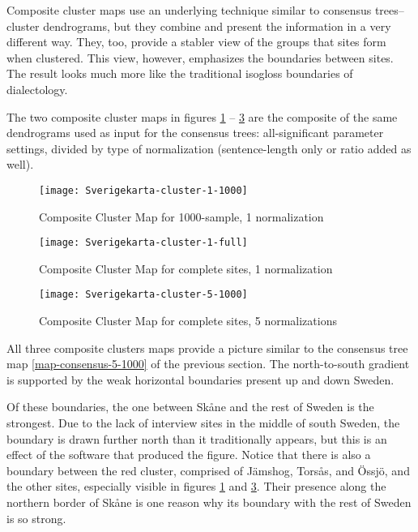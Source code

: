 Composite cluster maps use an underlying technique similar to
consensus trees--cluster dendrograms, but they combine and present the
information in a very different way. They, too, provide a stabler view
of the groups that sites form when clustered. This view, however,
emphasizes the boundaries between sites. The result looks
much more like the traditional isogloss boundaries of
dialectology.

The two composite cluster maps in figures \ref{map-composite-1-1000}
-- \ref{map-composite-5-1000} are the composite of the same
dendrograms used as input for the consensus trees: all-significant
parameter settings, divided by type of normalization (sentence-length
only or ratio added as well).

\begin{figure}
\texttt{[image: Sverigekarta-cluster-1-1000]}
\caption{Composite Cluster Map for 1000-sample, 1 normalization}
\label{map-composite-1-1000}
\end{figure}

\begin{figure}
\texttt{[image: Sverigekarta-cluster-1-full]}
\caption{Composite Cluster Map for complete sites, 1 normalization}
\label{map-composite-1-full}
\end{figure}

\begin{figure}
\texttt{[image: Sverigekarta-cluster-5-1000]}
\caption{Composite Cluster Map for complete sites, 5 normalizations}
\label{map-composite-5-1000}
\end{figure}

All three composite clusters maps provide a picture similar to the
consensus tree map \ref{map-consensus-5-1000} of the previous
section. The north-to-south gradient is supported by the
weak horizontal boundaries present up and down Sweden.

Of these boundaries, the one between Sk\aa{}ne and the rest of Sweden is
the strongest. Due to the lack of interview sites in the middle of
south Sweden, the boundary is drawn further north than it
traditionally appears, but this is an effect of the software that
produced the figure. Notice that there is also a boundary between the
red cluster, comprised of J\"amshog, Tors\aa{}s, and \"Ossj\"o, and the
other sites, especially visible in figures \ref{map-composite-1-1000} and
\ref{map-composite-5-1000}. Their presence along the northern border
of Sk\aa{}ne is one reason why its boundary with the rest of Sweden is
so strong.

